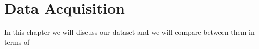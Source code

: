 \chapter{Data Acquisition}

In this chapter we will discuss our dataset and we will compare between them in terms of 
